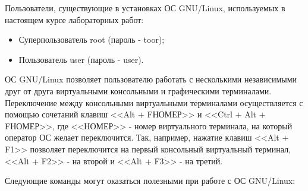 
Пользователи, существующие в установках ОС GNU/Linux, используемых в настоящем курсе лабораторных работ:

\begin{itemize}

	\item Суперпользователь root (пароль - toor);
	\item Пользователь user (пароль - user).

\end{itemize}

ОС GNU/Linux позволяет пользователю работать с несколькими независимыми друг от друга виртуальными консольными и графическими терминалами. Переключение между консольными виртуальными терминалами осуществляется с помощью сочетаний клавиш <<Alt + FНОМЕР>> и <<Ctrl + Alt + FНОМЕР>>, где <<НОМЕР>> - номер виртуального терминала, на который оператор ОС желает переключится. Так, например, нажатие клавиш <<Alt + F1>> позволяет переключится на первый консольный виртуальный терминал, <<Alt + F2>> - на второй и <<Alt + F3>> - на третий.

Следующие команды могут оказаться полезными при работе с ОС GNU/Linux:

